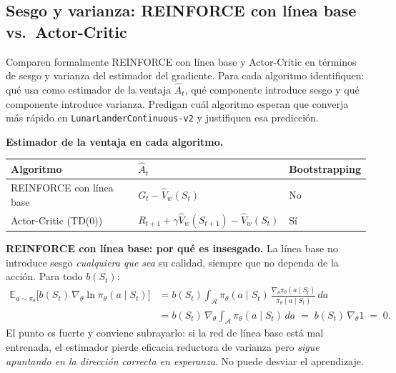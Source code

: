 \documentclass[11pt,letterpaper]{article}
\newcommand{\Esp}{\mathbb{E}}
\newcommand{\lead}[1]{\textbf{#1}}
\begin{document}
\subsection{Sesgo y varianza: REINFORCE con línea base vs.\ Actor-Critic}

\begin{enunciado}
Comparen formalmente REINFORCE con línea base y Actor-Critic en términos de sesgo y
varianza del estimador del gradiente. Para cada algoritmo identifiquen: qué usa como
estimador de la ventaja $\hat{A}_t$, qué componente introduce sesgo y qué componente
introduce varianza. Predigan cuál algoritmo esperan que converja más rápido en
\texttt{LunarLanderContinuous-v2} y justifiquen esa predicción.
\end{enunciado}

\begin{respuesta}
\lead{Estimador de la ventaja en cada algoritmo.}
\begin{center}
\begin{tabular}{lll}
\toprule
\textbf{Algoritmo} & $\hat{A}_t$ & \textbf{Bootstrapping} \\
\midrule
REINFORCE con línea base & $G_t - \hat{V}_w(S_t)$ & No \\
Actor-Critic (TD(0))     & $R_{t+1} + \gamma \hat{V}_w(S_{t+1}) - \hat{V}_w(S_t)$ & Sí \\
\bottomrule
\end{tabular}
\end{center}

\medskip
\lead{REINFORCE con línea base: por qué es insesgado.} La línea base no introduce sesgo
\emph{cualquiera que sea} su calidad, siempre que no dependa de la acción. Para todo
$b(S_t)$:
\begin{align*}
  \Esp_{a\sim\pi_\theta}\!\big[b(S_t)\,\nabla_\theta \ln\pi_\theta(a\mid S_t)\big]
  &= b(S_t)\int_{\mathcal{A}}\pi_\theta(a\mid S_t)\,
     \frac{\nabla_\theta \pi_\theta(a\mid S_t)}{\pi_\theta(a\mid S_t)}\,da \\[2pt]
  &= b(S_t)\,\nabla_\theta \int_{\mathcal{A}}\pi_\theta(a\mid S_t)\,da
   \;=\; b(S_t)\,\nabla_\theta 1 \;=\; 0.
\end{align*}
El punto es fuerte y conviene subrayarlo: si la red de línea base está mal entrenada, el
estimador pierde eficacia reductora de varianza pero \emph{sigue apuntando en la
dirección correcta en esperanza}. No puede desviar el aprendizaje.


\end{respuesta}
\end{document}
